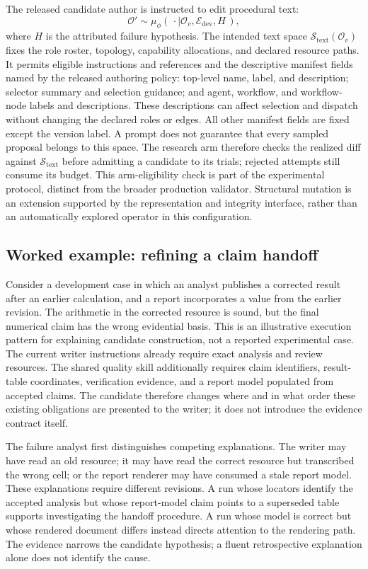 The released candidate author is instructed to edit procedural text:
\begin{equation}
\mathcal O'\sim
  \mu_{\phi}(\,\cdot\mid\mathcal O_v,\mathcal E_{\mathrm{dev}},H\,),
\label{eq:mutation}
\end{equation}
where $H$ is the attributed failure hypothesis. The intended text space $\mathcal S_{\mathrm{text}}(\mathcal O_v)$ fixes the role roster, topology, capability allocations, and declared resource paths. It permits eligible instructions and references and the descriptive manifest fields named by the released authoring policy: top-level name, label, and description; selector summary and selection guidance; and agent, workflow, and workflow-node labels and descriptions. These descriptions can affect selection and dispatch without changing the declared roles or edges. All other manifest fields are fixed except the version label. A prompt does not guarantee that every sampled proposal belongs to this space. The research arm therefore checks the realized diff against $\mathcal S_{\mathrm{text}}$ before admitting a candidate to its trials; rejected attempts still consume its budget. This arm-eligibility check is part of the experimental protocol, distinct from the broader production validator. Structural mutation is an extension supported by the representation and integrity interface, rather than an automatically explored operator in this configuration.

\subsection{Worked example: refining a claim handoff}\label{sec:worked}
Consider a development case in which an analyst publishes a corrected result after an earlier calculation, and a report incorporates a value from the earlier revision. The arithmetic in the corrected resource is sound, but the final numerical claim has the wrong evidential basis. This is an illustrative execution pattern for explaining candidate construction, not a reported experimental case. The current writer instructions already require exact analysis and review resources. The shared quality skill additionally requires claim identifiers, result-table coordinates, verification evidence, and a report model populated from accepted claims. The candidate therefore changes where and in what order these existing obligations are presented to the writer; it does not introduce the evidence contract itself.

The failure analyst first distinguishes competing explanations. The writer may have read an old resource; it may have read the correct resource but transcribed the wrong cell; or the report renderer may have consumed a stale report model. These explanations require different revisions. A run whose locators identify the accepted analysis but whose report-model claim points to a superseded table supports investigating the handoff procedure. A run whose model is correct but whose rendered document differs instead directs attention to the rendering path. The evidence narrows the candidate hypothesis; a fluent retrospective explanation alone does not identify the cause.

